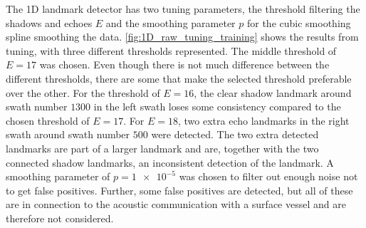 The 1D landmark detector has two tuning parameters, the threshold filtering the shadows and echoes $E$ and the smoothing parameter $p$ for the cubic smoothing spline smoothing the data. \cref{fig:1D_raw_tuning_training} shows the results from tuning, with three different thresholds represented. The middle threshold of $E = 17$ was chosen. Even though there is not much difference between the different thresholds, there are some that make the selected threshold preferable over the other. For the threshold of $E = 16$, the clear shadow landmark around swath number $1300$ in the left swath loses some consistency compared to the chosen threshold of $E = 17$. For $E = 18$, two extra echo landmarks in the right swath around swath number $500$ were detected. The two extra detected landmarks are part of a larger landmark and are, together with the two connected shadow landmarks, an inconsistent detection of the landmark. A smoothing parameter of $p = \num{1e-5}$ was chosen to filter out enough noise not to get false positives. Further, some false positives are detected, but all of these are in connection to the acoustic communication with a surface vessel and are therefore not considered. 


